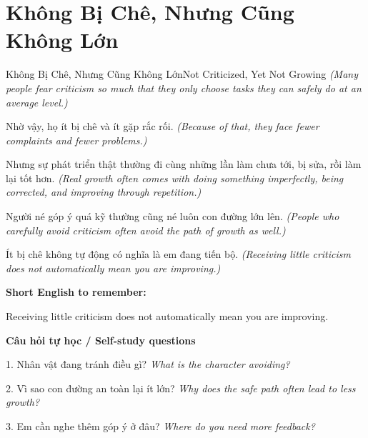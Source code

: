\section{Không Bị Chê, Nhưng Cũng Không Lớn}
\begin{truyen}{Không Bị Chê, Nhưng Cũng Không Lớn}{Not Criticized, Yet Not Growing}
\textit{(Many people fear criticism so much that they only choose tasks they can safely do at an average level.)}

Nhờ vậy, họ ít bị chê và ít gặp rắc rối.
\textit{(Because of that, they face fewer complaints and fewer problems.)}

Nhưng sự phát triển thật thường đi cùng những lần làm chưa tới, bị sửa, rồi làm lại tốt hơn.
\textit{(Real growth often comes with doing something imperfectly, being corrected, and improving through repetition.)}

Người né góp ý quá kỹ thường cũng né luôn con đường lớn lên.
\textit{(People who carefully avoid criticism often avoid the path of growth as well.)}

\end{truyen}

\begin{baihoc}
Ít bị chê không tự động có nghĩa là em đang tiến bộ.
\textit{(Receiving little criticism does not automatically mean you are improving.)}
\end{baihoc}

\begin{ghinhoanh}
\textbf{Short English to remember:}

Receiving little criticism does not automatically mean you are improving.

\end{ghinhoanh}

\begin{tuhocnhanh}
\textbf{Câu hỏi tự học / Self-study questions}

1. Nhân vật đang tránh điều gì? \textit{What is the character avoiding?}

2. Vì sao con đường an toàn lại ít lớn? \textit{Why does the safe path often lead to less growth?}

3. Em cần nghe thêm góp ý ở đâu? \textit{Where do you need more feedback?}
\end{tuhocnhanh}
\ngancach

